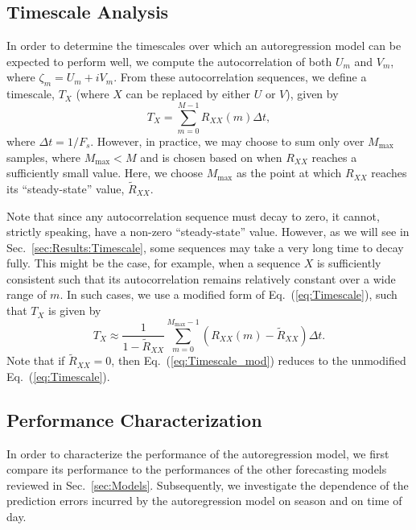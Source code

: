 \documentclass[11pt, oneside]{article}
\newcommand{\eqnref}[1]{Eq.~(\ref{#1})}
\newcommand{\secref}[1]{Sec.~\ref{#1}}
\begin{document}
\subsection{Timescale Analysis}\label{sec:Methodology:Timescale}
In order to determine the timescales over which an autoregression model can be expected to perform well, we compute the autocorrelation of both $U_m$ and $V_m$, where $\zeta_m = U_m + i V_m$.
From these autocorrelation sequences, we define a timescale, $T_X$ (where $X$ can be replaced by either $U$ or $V$), given by
\begin{equation}\label{eq:Timescale}
T_X = \sum_{m = 0}^{M-1} R_{XX}(m) \Delta t,
\end{equation}
where $\Delta t = 1/F_s$.
However, in practice, we may choose to sum only over $M_\text{max}$ samples, where $M_\text{max} < M$ and is chosen based on when $R_{XX}$ reaches a sufficiently small value.
Here, we choose $M_\text{max}$ as the point at which $R_{XX}$ reaches its ``steady-state'' value, $\tilde{R}_{XX}$.

Note that since any autocorrelation sequence must decay to zero, it cannot, strictly speaking, have a non-zero ``steady-state'' value.
However, as we will see in \secref{sec:Results:Timescale}, some sequences may take a very long time to decay fully.
This might be the case, for example, when a sequence $X$ is sufficiently consistent such that its autocorrelation remains relatively constant over a wide range of $m$.
In such cases, we use a modified form of \eqnref{eq:Timescale}, such that $T_X$ is given by
\begin{equation}\label{eq:Timescale_mod}
T_X \approx \frac{1}{1 - \tilde{R}_{XX}} \sum_{m = 0}^{M_\text{max}-1} (R_{XX}(m) - \tilde{R}_{XX}) \Delta t.
\end{equation}
Note that if $\tilde{R}_{XX} = 0$, then \eqnref{eq:Timescale_mod} reduces to the unmodified \eqnref{eq:Timescale}.

\subsection{Performance Characterization}
In order to characterize the performance of the autoregression model, we first compare its performance to the performances of the other forecasting models reviewed in \secref{sec:Models}.
Subsequently, we investigate the dependence of the prediction errors incurred by the autoregression model on season and on time of day.
\end{document}
